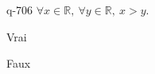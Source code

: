 \begin{truefalse}{q-706}
$\forall x \in \mathbb R,\:\forall y \in \mathbb R,\: x>y$.
\item Vrai
\item* Faux
\end{truefalse}

